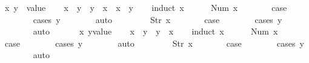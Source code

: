 \begin{isabellebody}
\ x\ y\ {\isacharcolon}{\isacharcolon}\ {\isachardoublequoteopen}value{\isachardoublequoteclose}\isanewline
\ \ \isamarkupfalse%
\ {\isachardoublequoteopen}x\ {\isasymle}\ y\ {\isasymLongrightarrow}\ y\ {\isasymle}\ x\ {\isasymLongrightarrow}\ x\ {\isacharequal}\ y{\isachardoublequoteclose}\isanewline
\ \ \isamarkupfalse%
\ {\isacharparenleft}induct\ x{\isacharparenright}\isanewline
\ \ \ \ \isamarkupfalse%
\ {\isacharparenleft}Num\ x{\isacharparenright}\isanewline
\ \ \ \ \isamarkupfalse%
\ \isamarkupfalse%
\ {\isacharquery}case\isanewline
\ \ \ \ \ \ \isamarkupfalse%
\ {\isacharparenleft}cases\ y{\isacharparenright}\isanewline
\ \ \ \ \ \ \isamarkupfalse%
\ auto\isanewline
\ \ \isamarkupfalse%
\isanewline
\ \ \ \ \isamarkupfalse%
\ {\isacharparenleft}Str\ x{\isacharparenright}\isanewline
\ \ \ \ \isamarkupfalse%
\ \isamarkupfalse%
\ {\isacharquery}case\isanewline
\ \ \ \ \ \ \isamarkupfalse%
\ {\isacharparenleft}cases\ y{\isacharparenright}\isanewline
\ \ \ \ \ \ \isamarkupfalse%
\ auto\isanewline
\ \ \isamarkupfalse%
\isanewline
{}\isamarkupfalse%
\isanewline
\ \ \isamarkupfalse%
\ x\ y{\isacharcolon}{\isacharcolon}{\isachardoublequoteopen}value{\isachardoublequoteclose}\isanewline
\ \ \isamarkupfalse%
\ {\isachardoublequoteopen}x\ {\isasymle}\ y\ {\isasymor}\ y\ {\isasymle}\ x{\isachardoublequoteclose}\isanewline
\ \ \isamarkupfalse%
\ {\isacharparenleft}induct\ x{\isacharparenright}\isanewline
\ \ \ \ \isamarkupfalse%
\ {\isacharparenleft}Num\ x{\isacharparenright}\isanewline
\ \ \ \ \isamarkupfalse%
\ \isamarkupfalse%
\ {\isacharquery}case\isanewline
\ \ \ \ \ \ \isamarkupfalse%
\ {\isacharparenleft}cases\ y{\isacharparenright}\isanewline
\ \ \ \ \ \ \isamarkupfalse%
\ auto\isanewline
\ \ \isamarkupfalse%
\isanewline
\ \ \ \ \isamarkupfalse%
\ {\isacharparenleft}Str\ x{\isacharparenright}\isanewline
\ \ \ \ \isamarkupfalse%
\ \isamarkupfalse%
\ {\isacharquery}case\isanewline
\ \ \ \ \ \ \isamarkupfalse%
\ {\isacharparenleft}cases\ y{\isacharparenright}\isanewline
\ \ \ \ \ \ \isamarkupfalse%
\ auto\isanewline
\ \ \isamarkupfalse%
\isanewline
{}\isamarkupfalse%
%
\endisatagproof
{\isafoldproof}%
%
\isadelimproof
%
\endisadelimproof
\isanewline
{}\isamarkupfalse%
\isanewline
%
\isadelimtheory
\isanewline
%
\endisadelimtheory
%
\isatagtheory
{}\isamarkupfalse%
%
\endisatagtheory
{\isafoldtheory}%
%
\isadelimtheory
%
\endisadelimtheory
%
\end{isabellebody}%
